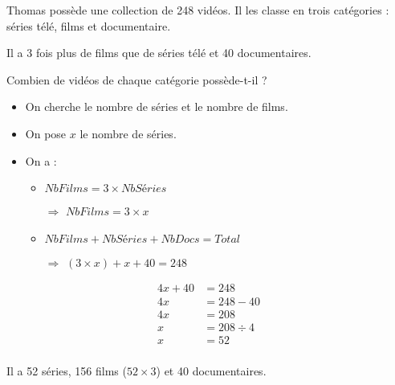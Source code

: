 \documentclass[12pt,a4paper]{article}
\begin{document}
\begin{myact}{4}
	Thomas possède une collection de 248 vidéos. Il les classe en trois catégories : séries télé, films et documentaire.
	
	Il a 3 fois plus de films que de séries télé et 40 documentaires.
	
	Combien de vidéos de chaque catégorie possède-t-il ?
	
\end{myact}

\begin{myrep}
\begin{itemize}
	\item On cherche le nombre de séries et le nombre de films.
	\item On pose $x$ le nombre de séries.
	\item On a :
		\begin{itemize}
			\item $NbFilms = 3 \times NbSéries$
			\item[$\Rightarrow$] $NbFilms = 3 \times x$
			\item $NbFilms + NbSéries + NbDocs = Total$
			\item[$\Rightarrow$] $(3 \times x) + x + 40 = 248$
		\end{itemize} 
\end{itemize}

\begin{align*}
	4x + 40 &= 248\\
	4x &= 248 - 40 \\
	4x &= 208 \\
	x &= 208 \div 4 \\
	x &= 52 \\
\end{align*}

Il a 52 séries, 156 films ($52 \times 3$) et 40 documentaires. 
\end{myrep}
	
%
%
%
%		
%		
%	
\end{document}
